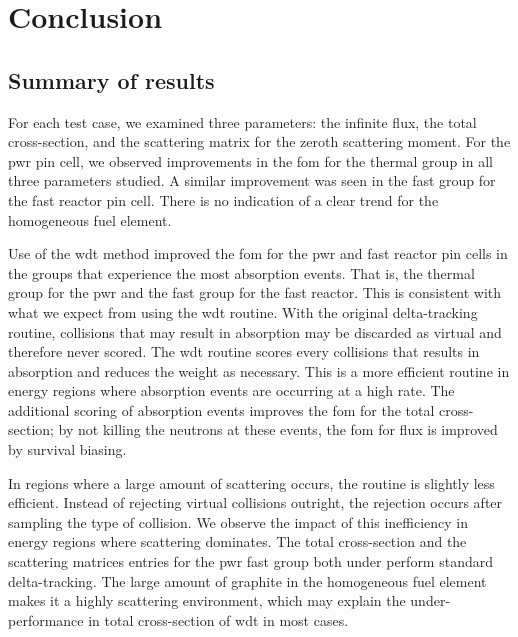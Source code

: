 
\chapter{Conclusion}
\label{chap:conclusion}


\section{Summary of results}
\label{sec:results_summary}

For each test case, we examined three parameters: the infinite flux,
the total cross-section, and the scattering matrix for the zeroth
scattering moment. For the \gls{pwr} pin cell, we observed
improvements in the \gls{fom} for the thermal group in all three
parameters studied. A similar improvement was seen in the fast group
for the fast reactor pin cell. There is no indication of a clear trend
for the homogeneous fuel element.

Use of the \gls{wdt} method improved the \gls{fom} for the \gls{pwr}
and fast reactor pin cells in the groups that experience the most
absorption events. That is, the thermal group for the \gls{pwr} and
the fast group for the fast reactor. This is consistent with what we
expect from using the \gls{wdt} routine. With the original
delta-tracking routine, collisions that may result in absorption may
be discarded as virtual and therefore never scored. The \gls{wdt}
routine scores every collisions that results in absorption and reduces
the weight as necessary. This is a more efficient routine in energy
regions where absorption events are occurring at a high rate. The
additional scoring of absorption events improves the \gls{fom} for the
total cross-section; by not killing the neutrons at these events, the
\gls{fom} for flux is improved by survival biasing. 

In regions where a large amount of scattering occurs, the routine is
slightly less efficient. Instead of rejecting virtual collisions
outright, the rejection occurs after sampling the type of
collision. We observe the impact of this inefficiency in energy
regions where scattering dominates. The total cross-section and the
scattering matrices entries for the \gls{pwr} fast group both under
perform standard delta-tracking. The large amount of graphite in the
homogeneous fuel element makes it a highly scattering environment,
which may explain the under-performance in total cross-section of
\gls{wdt} in most cases.

